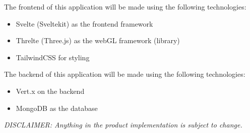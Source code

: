 \documentclass[12pt]{article}
\begin{document}
The frontend of this application will be made using the following technologies:
\begin{itemize}
    \item Svelte (Sveltekit) as the frontend framework
    \item Threlte (Three.js) as the webGL framework (library)
    \item TailwindCSS for styling
\end{itemize}
The backend of this application will be made using the following technologies:
\begin{itemize}
    \item Vert.x on the backend
    \item MongoDB as the database
\end{itemize}

\textit{DISCLAIMER: Anything in the product implementation is subject to change.}
\end{document}
